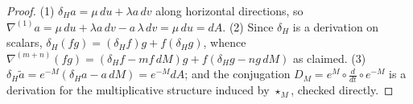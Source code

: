 \begin{proof}
(1) $\delta_H a=\mu\,du+\lambda a\,dv$ along horizontal directions, so
$\nabla^{(1)}a=\mu\,du+\lambda a\,dv-a\,\lambda\,dv=\mu\,du=dA$.  (2) Since
$\delta_H$ is a derivation on scalars,
$\delta_H(fg)=(\delta_H f)g+f(\delta_H g)$, whence
$\nabla^{(m+n)}(fg)=(\delta_H f-m f\,dM)g+f(\delta_H g-n g\,dM)$ as claimed.
(3) $\delta_H\widetilde a=e^{-M}(\delta_H a-a\,dM)=e^{-M}dA$; and the
conjugation $D_M=e^{M}\circ\frac d{dt}\circ e^{-M}$ is a derivation for the
multiplicative structure induced by $\star_M$, checked directly.
\end{proof}
